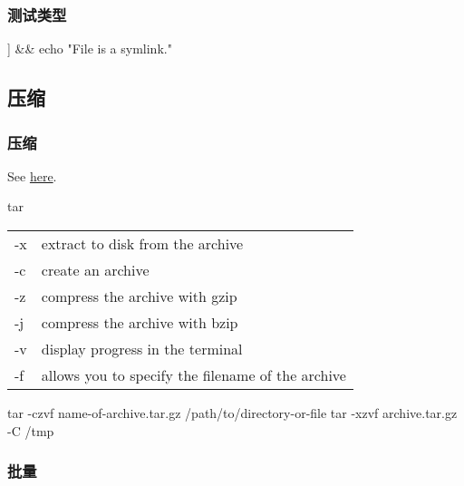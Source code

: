 \documentclass[hidelinks]{ctexart}
\begin{document}
\subsubsection{测试类型} %
\label{ssub:测试类型}

\begin{shlst}
[[ -L /path/to/file ]] && echo "File is a symlink."
\end{shlst}



\subsection{压缩} %
\label{sub:压缩}

\subsubsection{压缩} %
\label{ssub:压缩}

See \href{https://www.howtogeek.com/248780/how-to-compress-and-extract-files-using-the-tar-command-on-linux/}{here}.

\begin{shcommand}{tar}
\ttfamily
\begin{tabular}{@{$\bullet\quad$}ll}
   -x & extract to disk from the archive \\
   -c & create an archive \\
   -z & compress the archive with gzip \\
   -j & compress the archive with bzip \\
   -v & display progress in the terminal \\
   -f & allows you to specify the filename of the archive
\end{tabular}
\end{shcommand}
\begin{shlst}
tar -czvf name-of-archive.tar.gz /path/to/directory-or-file
tar -xzvf archive.tar.gz -C /tmp
\end{shlst}


\subsubsection{批量} %
\label{ssub:批量}

\end{document}
